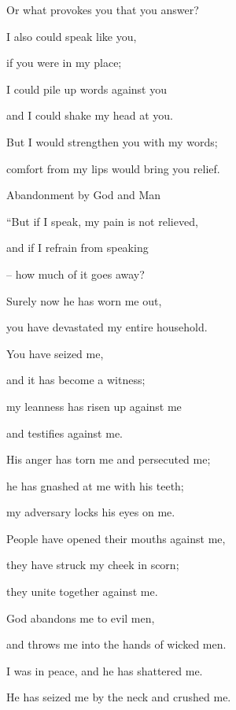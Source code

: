 {\par }{\Q Or
what
provokes
you that
you answer?
\par }{\Q {}I
also
could speak
like you,
\par }{\Q if
you were in my
place;
\par }{\Q I could
pile
up words
against
you
\par }{\Q and I could shake
my head at you.
\par }{\Q {}But I would strengthen
you with
my words;
\par }{\Q comfort
from my lips
would bring you relief.
\par }{\SH Abandonment by God and Man
\par }{\Q {}“But if
I speak,
my pain
is not
relieved,
\par }{\Q and if I refrain from speaking
\par }{\Q – how much of it goes away?
\par }{\Q {}Surely
now
he has worn
me out,
\par }{\Q you have devastated
my entire
household.
\par }{\Q {}You have seized
me,

\par }{\Q and it has become
a witness;
\par }{\Q my leanness
has risen up against
me
\par }{\Q and testifies against me.
\par }{\Q {}His anger
has torn
me and persecuted
me;
\par }{\Q he has gnashed
at
me with his teeth;
\par }{\Q my adversary
locks
his eyes on me.
\par }{\Q {}People have opened
their mouths
against me,
\par }{\Q they have struck
my cheek
in scorn;
\par }{\Q they unite
together
against me.
\par }{\Q {}God
abandons
me to evil men,
\par }{\Q and throws
me into
the hands
of wicked men.
\par }{\Q {}I was
in peace,
and he has shattered
me.

\par }{\Q He has seized
me by the neck
and crushed
me.

}
